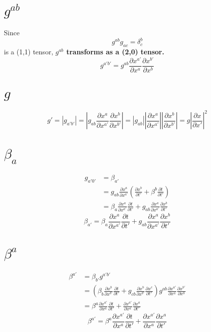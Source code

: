 \documentclass{article}
\begin{document}
\section{$g^{ab}$}
Since
\[
g^{ab}g_{ac} = \delta^{b}_{c}
\]
is a (1,1) tensor, {\bf {\color{red}$g^{ab}$ transforms as a (2,0) tensor. }}
\[
\boxed{
g^{a'b'} = g^{ab}\frac{\partial x^{a'}}{\partial x^{a}}\frac{\partial x^{b'}}{\partial x^{b}}
}
\]
\section{$g$}
{\color{red}
\[
\boxed{
g' = |g_{a'b'}| = |g_{ab}\frac{\partial x^{a}}{\partial x^{a'}}\frac{\partial x^{b}}{\partial x^{b'}}| = |g_{ab}||\frac{\partial x^{a}}{\partial x^{a'}}||\frac{\partial x^{b}}{\partial x^{b'}}| = g|\frac{\partial x}{\partial x'}|^{2}
}
\]
}
\section{$\beta_{a}$}
\begin{align*}
g_{a'0'} & = \beta_{a'}\\
& =  g_{ab}\frac{\partial x^{a}}{\partial x^{a'}}(\frac{\partial x^{b}}{\partial t'} + \beta^{b}\frac{\partial t}{\partial t'})\\
& = \beta_{a}\frac{\partial x^{a}}{\partial x^{a'}}\frac{\partial t}{\partial t'} + g_{ab}\frac{\partial x^{a}}{\partial x^{a'}}\frac{\partial x^{b}}{\partial t'}
\end{align*}
\[
\boxed{
\beta_{a'} = \beta_{a}\frac{\partial x^{a}}{\partial x^{a'}}\frac{\partial t}{\partial t'} + g_{ab}\frac{\partial x^{a}}{\partial x^{a'}}\frac{\partial x^{b}}{\partial t'}
}
\]
\section{$\beta^{a}$}
\begin{align*}
\beta^{a'} & = \beta_{b'}g^{a'b'}\\
& = (\beta_{b}\frac{\partial x^{b}}{\partial x^{b'}}\frac{\partial t}{\partial t'} + g_{cb}\frac{\partial x^{b}}{\partial x^{b'}}\frac{\partial x^{c}}{\partial t'})g^{ab}\frac{\partial x^{a'}}{\partial x^{a}}\frac{\partial x^{b'}}{\partial x^{b}}\\
& = \beta^{a}\frac{\partial x^{a'}}{\partial x^{a}}\frac{\partial t}{\partial t'} + \frac{\partial x^{a'}}{\partial x^{a}}\frac{\partial x^{a}}{\partial t'}
\end{align*}
\[
\boxed{
\beta^{a'} = \beta^{a}\frac{\partial x^{a'}}{\partial x^{a}}\frac{\partial t}{\partial t'} + \frac{\partial x^{a'}}{\partial x^{a}}\frac{\partial x^{a}}{\partial t'}
}
\]
\end{document}
